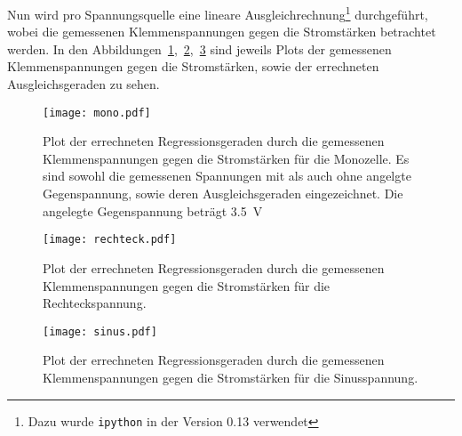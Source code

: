 Nun wird pro Spannungsquelle eine lineare Ausgleichrechnung\footnote{Dazu 
wurde \texttt{ipython} in der Version 0.13  verwendet} 
durchgeführt, 
wobei die gemessenen Klemmenspannungen gegen die 
Stromstärken betrachtet werden. In den 
Abbildungen~\ref{fig:mono},~\ref{fig:rechteck},~\ref{fig:sinus}
sind jeweils Plots der gemessenen Klemmenspannungen gegen die 
Stromstärken, 
sowie der errechneten Ausgleichsgeraden zu sehen.

\begin{figure}[]
\centering
\texttt{[image: mono.pdf]}
\caption{Plot der errechneten Regressionsgeraden durch die gemessenen 
Klemmenspannungen gegen die Stromstärken für die Monozelle. 
Es sind sowohl die gemessenen 
Spannungen mit als auch ohne angelgte Gegenspannung, sowie deren 
Ausgleichsgeraden eingezeichnet. Die angelegte Gegenspannung 
beträgt \SI{3.5}{\volt}}
\label{fig:mono}
\end{figure}
%
\begin{figure}[]
\centering
\texttt{[image: rechteck.pdf]}
\caption{Plot der errechneten Regressionsgeraden durch die gemessenen 
Klemmenspannungen gegen die Stromstärken für die Rechteckspannung.}
\label{fig:rechteck}
\end{figure}
%
\begin{figure}[]
\centering
\texttt{[image: sinus.pdf]}
\caption{Plot der errechneten Regressionsgeraden durch die gemessenen 
Klemmenspannungen gegen die Stromstärken für die Sinusspannung.}
\label{fig:sinus}
\end{figure}

